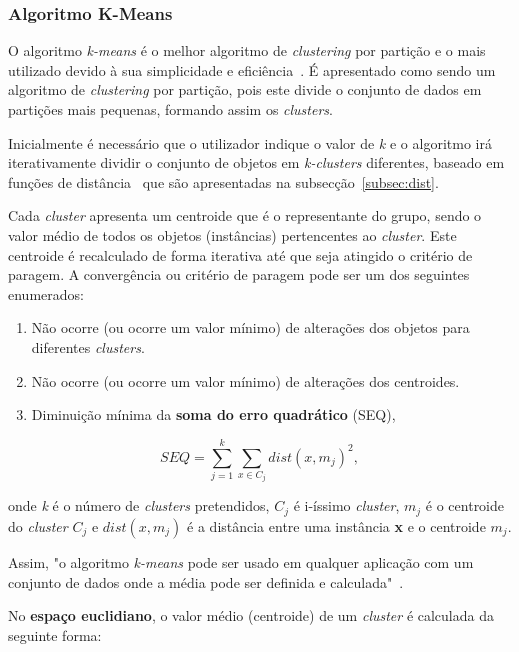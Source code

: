 \subsubsection{Algoritmo K-Means}
O algoritmo \textit{k-means} é o melhor algoritmo de \textit{clustering} por partição e o mais utilizado devido à sua simplicidade e eficiência~\citet{Liu2011}. É apresentado como  sendo  um algoritmo de \textit{clustering} por partição, pois este divide o conjunto de dados em partições mais pequenas, formando assim os \textit{clusters}.

Inicialmente é necessário que o utilizador indique o valor de \textit{k} e o algoritmo irá iterativamente dividir o conjunto de objetos em \textit{k-clusters} diferentes, baseado em funções de distância~\citet{Liu2011} que são apresentadas na subsecção~\ref{subsec:dist}.

Cada \textit{cluster} apresenta um centroide que é o representante do grupo, sendo o valor médio de todos os objetos (instâncias) pertencentes ao \textit{cluster}. Este centroide é recalculado de forma iterativa até que seja atingido o critério de paragem. A convergência ou critério de paragem pode ser um dos seguintes enumerados:

\begin{enumerate}
\item Não ocorre (ou ocorre um valor mínimo) de alterações dos objetos para diferentes \textit{clusters}.
\item Não ocorre (ou ocorre um valor mínimo) de alterações dos centroides.
\item Diminuição mínima da \textbf{soma do erro quadrático} (SEQ),
\end{enumerate}

\begin{equation}
SEQ = \sum_{j=1}^{k} \sum_{x \in C_{j} } dist(x, m_{j})^{2} ,
\end{equation}

onde \textit{k} é o número de \textit{clusters} pretendidos, $ C_{j} $ é i-íssimo \textit{cluster}, $ m_{j} $ é o centroide do \textit{cluster} $ C_{j} $ e $ dist(x, m_{j}) $ é a distância entre uma instância \textbf{x} e o centroide $ m_{j} $.

Assim, "o algoritmo \textit{k-means} pode ser usado em qualquer aplicação com um conjunto de dados onde a média pode ser definida e calculada"~\citet{Liu2011}.

No \textbf{espaço euclidiano}, o valor médio (centroide) de um \textit{cluster} é calculada da seguinte forma:

